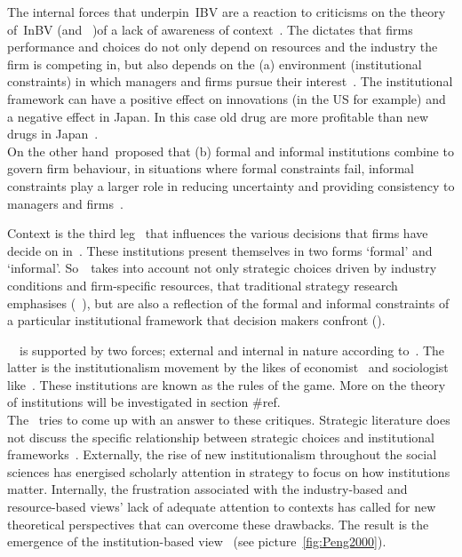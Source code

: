 The internal forces that underpin~\gls{IBV} are a reaction to criticisms on the theory of~\gls{InBV} (and ~\rbv)of a lack of awareness of context~\cite{Narayanan:2005}.  
The \ibv dictates that firms performance and choices do not only depend on resources and the industry the firm is competing in, but also depends on the (a) environment (institutional constraints) in which managers and firms pursue their interest~\cite{Peng:2008b}.%
The institutional framework can have a positive effect on innovations (in the US for example) and a negative effect in Japan. 
In this case old drug are more profitable than new drugs in Japan~\cite{Peng:2008b}. \\
On the other hand~\ibv proposed that (b) formal and informal institutions combine to govern firm behaviour, in situations where formal constraints fail, informal constraints play a larger role in reducing uncertainty and providing consistency to managers and firms~\cite{Peng:2008b}. 



Context is the third leg~\cite{Peng:2009} that influences the various decisions that firms have decide on in~\ib. 
These institutions present themselves in two forms `formal' and `informal'. 
So~\ibv~takes into account not only strategic choices driven by industry conditions and firm-specific resources, that traditional strategy research emphasises (~\cite{Porter:1980,Barney:1991}), but are also a reflection of the formal and informal constraints of a particular institutional framework that decision makers confront (\cite{Oliver:1997,Scott:1995}). 

~\ibv~is supported by two forces; external and internal in nature according to~\cite{Peng:2009}. 
The latter is the institutionalism movement by the likes of economist~\cite{North:1990} and sociologist like~\cite{DiMaggio:1983,Scott:1995}. 
These institutions are known as the rules of the game.
More on the theory of institutions will be investigated in section #ref.\\



The \ibv~tries to come up with an answer to these critiques. 
Strategic literature does not discuss the specific relationship between strategic choices and institutional frameworks~\cite{Peng:2008}.
Externally, the rise of new institutionalism throughout the social sciences has energised scholarly attention in strategy to focus on how institutions matter. 
Internally, the frustration associated with the industry-based and resource-based views’ lack of adequate attention to contexts has called for new theoretical perspectives that can overcome these drawbacks. 
The result is the emergence of the institution-based view~\cite{Peng:2009} (see picture~\ref{fig:Peng2000}).

